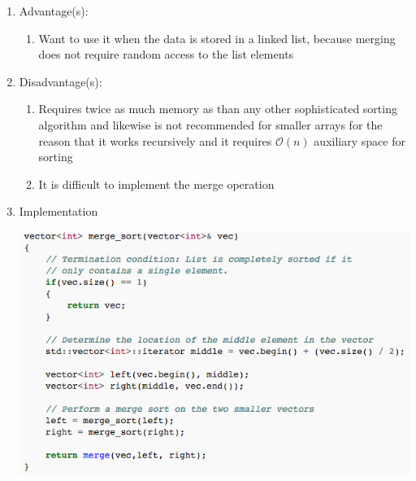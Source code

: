 \documentclass [12pt, executivepaper]{article}
\begin{document}
\begin{enumerate}
\begin{enumerate}
\begin{enumerate}
\end{enumerate}

\item Advantage(s):

\begin{enumerate}

\item Want to use it when the data is stored in a linked list, because merging does not require random access to the list elements

\end{enumerate}

\item Disadvantage(s):

\begin{enumerate}

\item Requires twice as much memory as than any other sophisticated sorting algorithm and likewise is not recommended for smaller arrays for the reason that it works recursively and it requires 
$\mathcal{O}(n)$ auxiliary space for sorting

\item It is difficult to implement the merge operation

\end{enumerate}

\pagebreak

\vspace*{-40mm}

\item Implementation

\includegraphics[scale=0.5]{MergeSortPart1}

\vspace{3mm}


\end{enumerate}
\end{enumerate}
\end{document}
